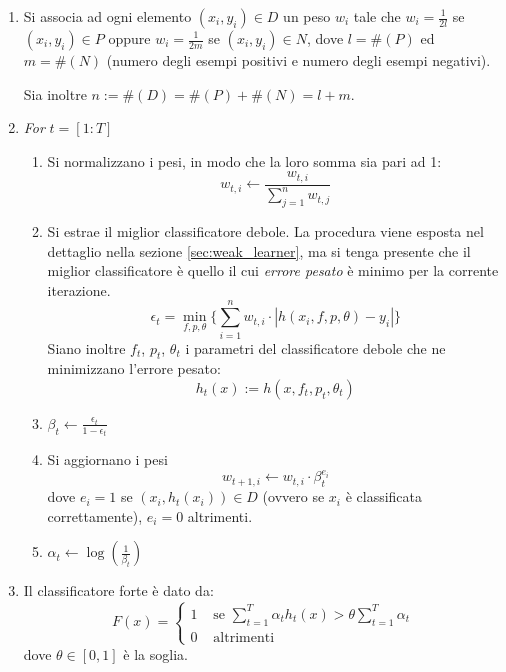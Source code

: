             \begin{enumerate}
                \item Si associa ad ogni elemento $(x_i, y_i) \in D$ un peso $w_i$ tale che $w_i = \frac{1}{2l}$ se $(x_i, y_i) \in P$ oppure $w_i = \frac{1}{2m}$ se $(x_i, y_i) \in N$, dove $l = \#(P)$ ed $m = \#(N)$ (numero degli esempi positivi e numero degli esempi negativi).

                Sia inoltre $n := \#(D) = \#(P) + \#(N) = l + m$.

                \item \emph{For} $t = [1:T]$
                \begin{enumerate}
                    \item Si normalizzano i pesi, in modo che la loro somma sia pari ad 1:
                    $$ w_{t,i} \leftarrow \frac{w_{t,i}}{\sum_{j = 1}^{n}w_{t,j}}$$

                    \item \label{adaboost_minimum_error}
                    Si estrae il miglior classificatore debole. La procedura viene esposta nel dettaglio nella sezione \ref{sec:weak_learner}, ma si tenga presente che il miglior classificatore è quello il cui \emph{errore pesato} è minimo per la corrente iterazione.
                    $$ \epsilon_t = \min_{f,p,\theta} \{
                    \sum_{i = 1}^{n} w_{t,i} \cdot |h(x_i, f, p, \theta) - y_i|
                    \} $$
                    Siano inoltre $f_t$, $p_t$, $\theta_t$ i parametri del classificatore debole che ne minimizzano l'errore pesato:
                    $$ h_t(x) := h(x, f_t, p_t, \theta_t) $$

                    \item \label{adaboost_beta} $\beta_t \leftarrow \frac{\epsilon_t}{1 - \epsilon_t}$

                    \item \label{adaboost_update_weights} Si aggiornano i pesi
                    $$ w_{t+1, i} \leftarrow w_{t,i} \cdot \beta_{t}^{e_i} $$
                    dove $e_i = 1$ se $(x_i, h_t(x_i)) \in D$ (ovvero se $x_i$ è classificata correttamente), $e_i = 0$ altrimenti.

                    \item $\alpha_t \leftarrow \log(\frac{1}{\beta_t})$
                \end{enumerate}

                \item \label{adaboost_strong_classifier} Il classificatore forte è dato da:
                \begin{equation}
                    F(x) = \begin{cases}
                    1 & \text{ se } \sum_{t = 1}^{T} \alpha_t h_t(x) > \theta \sum_{t = 1}^{T} \alpha_t \\
                    0 & \text{ altrimenti }
                \end{cases}
            \end{equation}
            dove $\theta \in [0,1]$ è la soglia.
            \end{enumerate}

